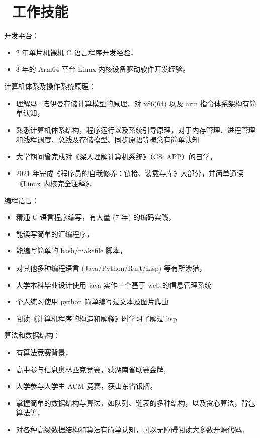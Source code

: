 \documentclass{resume}
\begin{document}
\section{\faCogs\ 工作技能}
开发平台：
\begin{itemize}[parsep=0.5ex]
  \item 2 年单片机裸机 C 语言程序开发经验，
  \item 3 年的 Arm64 平台 Linux 内核设备驱动软件开发经验。
\end{itemize}
计算机体系及操作系统原理：
\begin{itemize}[parsep=0.5ex]
  \item 理解冯·诺伊曼存储计算模型的原理，对 x86(64) 以及 arm 指令体系架构有简单认知，
  \item 熟悉计算机体系结构，程序运行以及系统引导原理，对于内存管理、进程管理和线程调度、总线及存储模型、同步原语等概念有简单认知
  \item 大学期间曾完成对《深入理解计算机系统》（CS: APP）的自学，
  \item 2021 年完成《程序员的自我修养：链接、装载与库》大部分，并简单通读《Linux 内核完全注释》，
\end{itemize}
编程语言：
\begin{itemize}[parsep=0.5ex]
  \item 精通 C 语言程序编写，有大量 (7 年) 的编码实践，
  \item 能读写简单的汇编程序，
  \item 能编写简单的 bash/makefile 脚本，
  \item 对其他多种编程语言 (Java/Python/Rust/Lisp) 等有所涉猎，
    \item 大学本科毕业设计使用 java 实作一个基于 web 的信息管理系统
    \item 个人练习使用 python 简单编写过文本及图片爬虫
    \item 阅读《计算机程序的构造和解释》时学习了解过 lisp
\end{itemize}
算法和数据结构：
\begin{itemize}[parsep=0.5ex]
  \item 有算法竞赛背景，
    \item 高中参与信息奥林匹克竞赛，获湖南省联赛金牌,
    \item 大学参与大学生 ACM 竞赛，获山东省银牌。
  \item 掌握简单的数据结构与算法，如队列、链表的多种结构，以及贪心算法，背包算法等，
  \item 对各种高级数据结构和算法有简单认知，可以无障碍阅读大多数开源代码。
\end{itemize}
\end{document}
